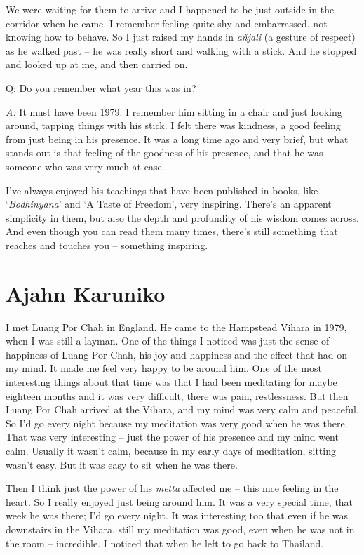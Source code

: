 We were waiting for them to arrive and I happened to be just outside in
the corridor when he came. I remember feeling quite shy and embarrassed, 
not knowing how to behave. So I just raised my hands in \emph{añjali} (a
gesture of respect) as he walked past -- he was really short and walking
with a stick. And he stopped and looked up at me, and then carried on. 

Q: Do you remember what year this was in? 

\emph{A:} It must have been 1979. I remember him sitting in a chair and
just looking around, tapping things with his stick. I felt there was
kindness, a good feeling from just being in his presence. It was a long
time ago and very brief, but what stands out is that feeling of the
goodness of his presence, and that he was someone who was very much at
ease. 

I've always enjoyed his teachings that have been published in books, 
like `\emph{Bodhinyana}' and `A Taste of Freedom', very inspiring.
There's an apparent simplicity in them, but also the depth and
profundity of his wisdom comes across. And even though you can read them
many times, there's still something that reaches and touches you --
something inspiring. 

\section{Ajahn Karuniko}

I met Luang Por Chah in England. He came to the Hampstead Vihara in
1979, when I was still a layman. One of the things I noticed was just
the sense of happiness of Luang Por Chah, his joy and happiness and the
effect that had on my mind. It made me feel very happy to be around him. 
One of the most interesting things about that time was that I had been
meditating for maybe eighteen months and it was very difficult, there
was pain, restlessness. But then Luang Por Chah arrived at the Vihara, 
and my mind was very calm and peaceful. So I'd go every night because my
meditation was very good when he was there. That was very interesting --
just the power of his presence and my mind went calm. Usually it wasn't
calm, because in my early days of meditation, sitting wasn't easy. But
it was easy to sit when he was there. 

Then I think just the power of his \emph{mettā} affected me -- this nice
feeling in the heart. So I really enjoyed just being around him. It was
a very special time, that week he was there; I'd go every night. It was
interesting too that even if he was downstairs in the Vihara, still my
meditation was good, even when he was not in the room -- incredible. I
noticed that when he left to go back to Thailand. 

